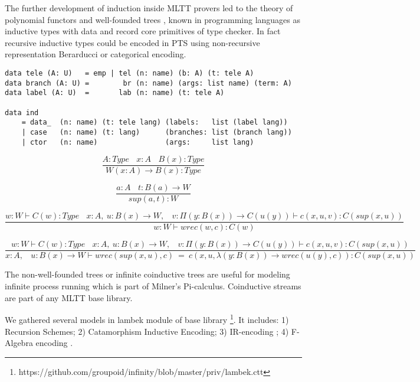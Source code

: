 The further development of induction \cite{Dybjer94,Vene00} inside MLTT provers led
to the theory of polynomial functors and well-founded trees \cite{Gambino03},
known in programming languages as inductive types with data
and record core primitives of type checker. In fact recursive inductive
types \cite{Wadler90} could be encoded in PTS using non-recursive representation
Berarducci \cite {Bohm85} or categorical encoding.

\begin{lstlisting}[mathescape=true]
data tele (A: U)   = emp | tel (n: name) (b: A) (t: tele A)
data branch (A: U) =        br (n: name) (args: list name) (term: A)
data label (A: U)  =       lab (n: name) (t: tele A)

data ind
    = data_  (n: name) (t: tele lang) (labels:   list (label lang))
    | case   (n: name) (t: lang)      (branches: list (branch lang))
    | ctor   (n: name)                (args:     list lang)
\end{lstlisting}

\begin{equation}
\tag{$W$-formation}
\dfrac
{A:Type\ \ \ \ x:A\ \ \ \ B(x):Type}
{W (x:A) \rightarrow B(x) : Type}
\end{equation}

\begin{equation}
\tag{$W$-intro}
\dfrac
{a:A\ \ \ \ t: B(a) \rightarrow W}
{sup(a,t) : W}
\end{equation}

\begin{equation}
\tag{$W$-elimination}
\dfrac
{w: W \vdash C(w) : Type\ \ \ \ x:A,\ u:B(x) \rightarrow W,\ \ \ \ v:\Pi (y:B(x)) \rightarrow C(u(y)) \vdash c(x,u,v):C(sup(x,u))}
{w:W \vdash wrec(w,c):C(w)}
\end{equation}

\begin{equation}
\tag{$W$-computation}
\dfrac
{w: W \vdash C(w) : Type\ \ \ \ x:A,\ u:B(x) \rightarrow W,\ \ \ \ v:\Pi (y:B(x)) \rightarrow C(u(y)) \vdash c(x,u,v):C(sup(x,u))}
{x:A,\ \ \ \ u:B(x) \rightarrow W \vdash wrec(sup(x,u),c)\ =\ c(x,u,\lambda (y:B(x)) \rightarrow wrec(u(y),c)):C(sup(x,u))}
\end{equation}

The non-well-founded trees or infinite coinductive trees \cite{Jacobs97,Basold16}
are useful for modeling infinite process running which is
part of Milner's Pi-calculus. Coinductive streams are
part of any MLTT base library.

We gathered several models in lambek module of base library \footnote{https://github.com/groupoid/infinity/blob/master/priv/lambek.ctt}.
It includes:
1) Recursion Schemes;
2) Catamorphism Inductive Encoding;
3) IR-encoding \cite{Dagand13};
4) F-Algebra encoding  \cite{Hinze13}.

